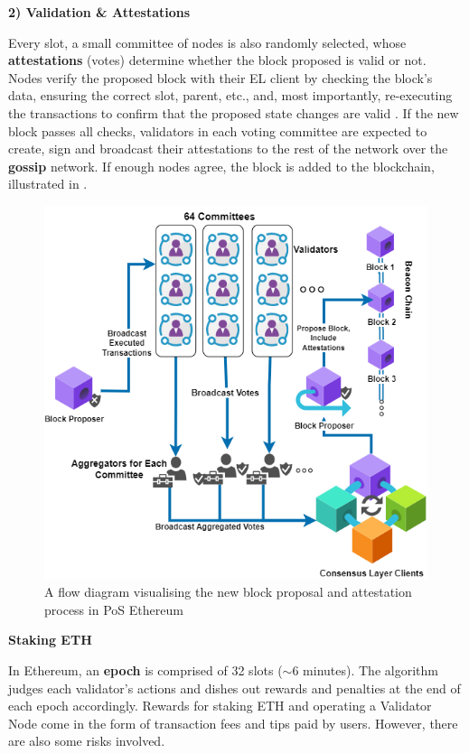 \textbf{2) Validation \& Attestations}
\label{AttestationsLitRev}

Every slot, a small committee of nodes is also randomly selected, whose \textbf{attestations} (votes) determine whether the block proposed is valid or not. Nodes verify the proposed block with their EL client by checking the block's data, ensuring the correct slot, parent, etc., and, most importantly, re-executing the transactions to confirm that the proposed state changes are valid \cite{EthereumEthereum.org}. If the new block passes all checks, validators in each voting committee are expected to create, sign and broadcast their attestations to the rest of the network over the \textbf{gossip} network. If enough nodes agree, the block is added to the blockchain,  illustrated in . 

\begin{figure}[!htb]
    \centering
    \includegraphics[width=13cm,center]{Figures/AttestationsDiragram.png}
    \caption{A flow diagram visualising the new block proposal and attestation process in PoS Ethereum}
    \label{Figure:AttestationsDiragram}
\end{figure}

\textbf{Staking ETH}

In Ethereum, an \textbf{epoch} is comprised of 32 slots ($\sim$6 minutes). The algorithm judges each validator's actions and dishes out rewards and penalties at the end of each epoch accordingly. Rewards for staking ETH and operating a Validator Node come in the form of transaction fees and tips paid by users. However, there are also some risks involved.

